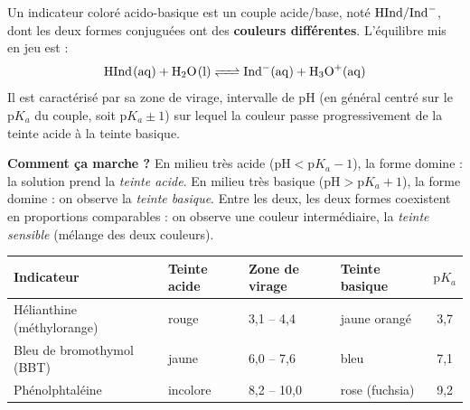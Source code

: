 \documentclass[11pt]{article}
\newcommand{\cle}[1]{{\popxbold\color{popdark}#1}}
\begin{document}
\begin{definition}
Un \cle{indicateur coloré} acido-basique est un couple acide/base, noté $\ce{HInd}/\ce{Ind-}$, dont les deux formes conjuguées ont des \textbf{couleurs différentes}. L'équilibre mis en jeu est :
\[ \ce{HInd(aq) + H2O(l) <=> Ind^-(aq) + H3O+(aq)} \]
Il est caractérisé par sa \cle{zone de virage}, intervalle de pH (en général centré sur le $\mathrm{p}K_a$ du couple, soit $\mathrm{p}K_a \pm 1$) sur lequel la couleur passe progressivement de la teinte acide à la teinte basique.
\end{definition}

\textbf{Comment ça marche ?} En milieu très acide ($\mathrm{pH} < \mathrm{p}K_a - 1$), la forme  domine : la solution prend la \emph{teinte acide}. En milieu très basique ($\mathrm{pH} > \mathrm{p}K_a + 1$), la forme  domine : on observe la \emph{teinte basique}. Entre les deux, les deux formes coexistent en proportions comparables : on observe une couleur intermédiaire, la \emph{teinte sensible} (mélange des deux couleurs).

\begin{center}
\begin{tabularx}{\linewidth}{|l|X|X|X|c|}
\hline
\rowcolor{popblueL} \textbf{Indicateur} & \textbf{Teinte acide} & \textbf{Zone de virage} & \textbf{Teinte basique} & $\mathrm{p}K_a$ \\
\hline
Hélianthine (méthylorange) & rouge & 3,1 -- 4,4 & jaune orangé & 3,7 \\
\hline
Bleu de bromothymol (BBT) & jaune & 6,0 -- 7,6 & bleu & 7,1 \\
\hline
Phénolphtaléine & incolore & 8,2 -- 10,0 & rose (fuchsia) & 9,2 \\
\hline
\end{tabularx}
\end{center}
\end{document}
